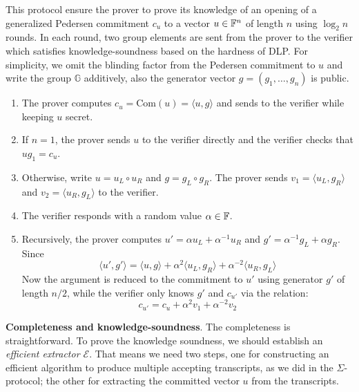 \documentclass{article}
\begin{document}
\begin{boxx1} \label{def:bulletproof}
This protocol ensure the prover to prove its knowledge of an opening of a generalized Pedersen commitment $c_u$ to a vector $u \in \mathbb{F}^n$ of length $n$ using $\log_2 n$ rounds. In each round, two group elements are sent from the prover to the verifier which satisfies knowledge-soundness based on the hardness of DLP. For simplicity, we omit the blinding factor from the Pedersen commitment to $u$ and write the group $\mathbb{G}$ additively, also the generator vector $g = (g_1, \dots, g_n)$ is public.
\begin{enumerate}
\item\label{item:89} The prover computes $c_u = \text{Com}(u) = \langle u, g \rangle$ and sends to the verifier while keeping $u$ secret. 
\item\label{item:90} If $n = 1$, the prover sends $u$ to the verifier directly and the verifier checks that $ug_1 = c_u$. 
\item\label{item:91} Otherwise, write $u = u_L \circ u_R$ and $g = g_L \circ g_R$. The prover sends $v_1 = \langle u_{L}, g_R \rangle$ and $v_{2} = \langle u_{R}, g_L \rangle$ to the verifier. 
\item\label{item:92} The verifier responds with a random value $\alpha \in \mathbb{F}$. 
\item\label{item:93} Recursively, the prover computes $u' = \alpha u_L + \alpha^{-1} u_R$ and $g'  = \alpha^{-1} g_L + \alpha g_R$. Since
\begin{equation*}
\langle u', g' \rangle = \langle u, g \rangle + \alpha^2 \langle u_{L}, g_R \rangle + \alpha^{-2} \langle u_R, g_{L} \rangle
\end{equation*}
Now the argument is reduced to the commitment to $u'$ using generator $g'$ of length $n/2$, while the verifier only knows $g'$ and $c_{u'}$ via the relation: 
\begin{equation*}
c_{u'} = c_u + \alpha^2 v_1 + \alpha^{-2} v_2
\end{equation*}
\end{enumerate}
\end{boxx1}


\textbf{Completeness and knowledge-soundness}. The completeness is straightforward. To prove the knowledge soundness, we should establish an \textit{efficient extractor $\mathcal{E}$}. That means we need two steps, one for constructing an efficient algorithm to produce multiple accepting transcripts, as we did in the $\Sigma$-protocol; the other for extracting the committed vector $u$ from the transcripts.
\end{document}
